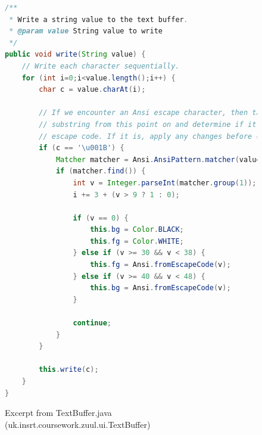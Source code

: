 \documentclass{article}
\begin{document}
    \begin{figure}
        \begin{lstlisting}[language=Java]
/**
 * Write a string value to the text buffer.
 * @param value String value to write
 */
public void write(String value) {
    // Write each character sequentially.
    for (int i=0;i<value.length();i++) {
        char c = value.charAt(i);

        // If we encounter an Ansi escape character, then take the
        // substring from this point on and determine if it is a valid
        // escape code. If it is, apply any changes before continuing.
        if (c == '\u001B') {
            Matcher matcher = Ansi.AnsiPattern.matcher(value.substring(i));
            if (matcher.find()) {
                int v = Integer.parseInt(matcher.group(1));
                i += 3 + (v > 9 ? 1 : 0);

                if (v == 0) {
                    this.bg = Color.BLACK;
                    this.fg = Color.WHITE;
                } else if (v >= 30 && v < 38) {
                    this.fg = Ansi.fromEscapeCode(v);
                } else if (v >= 40 && v < 48) {
                    this.bg = Ansi.fromEscapeCode(v);
                }

                continue;
            }
        }

        this.write(c);
    }
}\end{lstlisting}
        \caption{Excerpt from TextBuffer.java (uk.insrt.coursework.zuul.ui.TextBuffer)} \label{fig:ansi-match}
    \end{figure}
\end{document}
